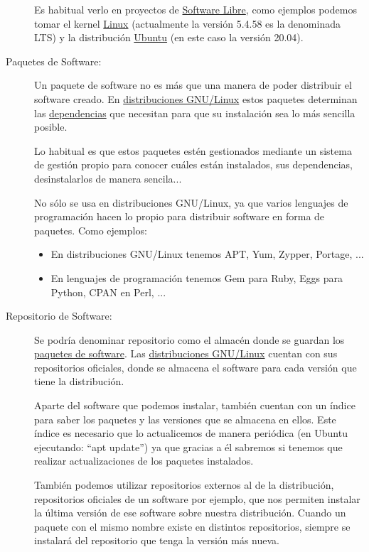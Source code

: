 \begin{description}
    Es habitual verlo en proyectos de \hyperlink{software_libre}{Software Libre}, como ejemplos podemos tomar el kernel \hyperlink{linux}{Linux} (actualmente la versión 5.4.58 es la denominada LTS) y la distribución \hyperlink{ubuntu}{Ubuntu} (en este caso la versión 20.04).


    \hypertarget{paquete_de_software}{}
    \item[Paquetes de Software:] Un paquete de software no es más que una manera de poder distribuir el software creado. En \hyperlink{distribucion_gnu_linux}{distribuciones GNU/Linux} estos paquetes determinan las \hyperlink{dependencia_software}{dependencias} que necesitan para que su instalación sea lo más sencilla posible.

    Lo habitual es que estos paquetes estén gestionados mediante un sistema de gestión propio para conocer cuáles están instalados, sus dependencias, desinstalarlos de manera sencila...

    No sólo se usa en distribuciones GNU/Linux, ya que varios lenguajes de programación hacen lo propio para distribuir software en forma de paquetes. Como ejemplos:
    \begin{itemize}
        \item En distribuciones GNU/Linux tenemos APT, Yum, Zypper, Portage, ...
        \item En lenguajes de programación tenemos Gem para Ruby, Eggs para Python, CPAN en Perl, ...
    \end{itemize}


    \hypertarget{repositorio_de_software}{}
    \item[Repositorio de Software:] Se podría denominar repositorio como el almacén donde se guardan los \hyperlink{paquete_de_software}{paquetes de software}. Las \hyperlink{distribucion_gnu_linux}{distribuciones GNU/Linux} cuentan con sus repositorios oficiales, donde se almacena el software para cada versión que tiene la distribución.

    Aparte del software que podemos instalar, también cuentan con un índice para saber los paquetes y las versiones que se almacena en ellos. Este índice es necesario que lo actualicemos de manera periódica (en Ubuntu ejecutando: “apt update”) ya que gracias a él sabremos si tenemos que realizar actualizaciones de los paquetes instalados.

    También podemos utilizar repositorios externos al de la distribución, repositorios oficiales de un software por ejemplo, que nos permiten instalar la última versión de ese software sobre nuestra distribución. Cuando un paquete con el mismo nombre existe en distintos repositorios, siempre se instalará del repositorio que tenga la versión más nueva.


\end{description}
